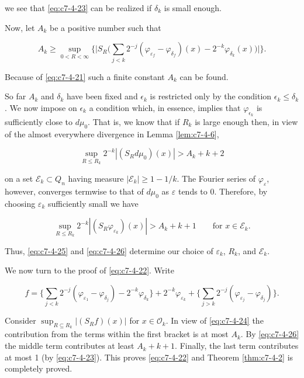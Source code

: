 we see that \eqref{eq:c7-4-23} can be realized if $\delta_{k}$ is small enough.

Now, let $A_{k}$ be a positive number such that

\begin{equation}\label{eq:c7-4-24}
A_{k}\geq\sup_{0<R<\infty}\Big\{\Big|S_{R}\Big(\sum_{j<k}2^{-j}(\varphi_{\varepsilon_{f}}-\varphi_{\delta_{f}})(x)-2^{-k}\varphi_{\delta_{k}}(x)\Big)\Big|\Big\}.
\end{equation}

Because of \eqref{eq:c7-4-21} such a finite constant $A_{k}$ can be found.

So far $A_k$ and $\delta_k$ have been fixed and $\epsilon_k$ is restricted only by the condition $\epsilon_k \leq \delta_k$. We now impose on $\epsilon_k$ a condition which, in essence, implies that $\varphi_{\epsilon_k}$ is sufficiently close to $d\mu_0$. That is, we know that if $R_k$ is large enough then, in view of the almost everywhere divergence in Lemma \ref{lem:c7-4-6},

\begin{equation}\label{eq:c7-4-25}
\sup_{R\leq R_{k}}2^{-k}|(S_{R} d\mu_{0})(x)|>A_{k}+k+2
\end{equation}

on a set $\mathcal{E}_k \subset Q_n$ having measure $|\mathcal{E}_k| \geq 1 - 1/k$. The Fourier series of $\varphi_\varepsilon$, however, converges termwise to that of $d\mu_0$ as $\varepsilon$ tends to 0. Therefore, by choosing $\varepsilon_k$ sufficiently small we have

\begin{equation}\label{eq:c7-4-26}
\sup_{R\leq R_{k}}2^{-k}|(S_{R}\varphi_{\varepsilon_{k}})(x)|>A_{k}+k+1\qquad\text{for }x\in\mathcal{E}_{k}.
\end{equation}

Thus, \eqref{eq:c7-4-25} and \eqref{eq:c7-4-26} determine our choice of $\varepsilon_{k}$, $R_{k}$, and $\mathcal{E}_{k}$.

We now turn to the proof of \eqref{eq:c7-4-22}. Write

\[
f=\Big\{\sum_{j<k}2^{-j}(\varphi_{\varepsilon_{1}}-\varphi_{\delta_{j}})-2^{-k}\varphi_{\delta_{k}}\Big\}+2^{-k}\varphi_{\varepsilon_{k}}+\Big\{\sum_{j>k}2^{-j}(\varphi_{\varepsilon_{j}}-\varphi_{\delta_{j}})\Big\}.
\]

Consider $\sup_{R \subseteq R_k} |(S_R f)(x)|$ for $x \in \mathcal{O}_k$. In view of \eqref{eq:c7-4-24} the contribution from the terms within the first bracket is at most $A_k$. By \eqref{eq:c7-4-26} the middle term contributes at least $A_k + k + 1$. Finally, the last term contributes at most 1 (by \eqref{eq:c7-4-23}). This proves \eqref{eq:c7-4-22} and Theorem \ref{thm:c7-4-2} is completely proved.

